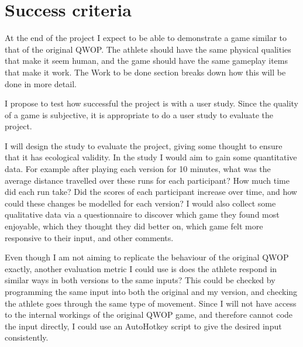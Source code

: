 \documentclass[12pt,a4paper,twoside]{article}
\begin{document}
\section*{Success criteria}


At the end of the project I expect to be able to demonstrate a game similar to that of the original QWOP.
The athlete should have the same physical qualities that make it seem human, and the game should have the same gameplay items that make it work. The Work to be done section breaks down how this will be done in more detail.

I propose to test how successful the project is with a user study. Since the quality of a game is subjective, it is appropriate to do a user study to evaluate the project.

I will design the study to evaluate the project, giving some thought to ensure that it has ecological validity.
In the study I would aim to gain some quantitative data.
For example after playing each version for 10 minutes, what was the average distance travelled over these runs for each participant? How much time did each run take? Did the scores of each participant increase over time, and how could these changes be modelled for each version?
I would also collect some qualitative data via a questionnaire to discover which game they found most enjoyable, which they thought they did better on, which game felt more responsive to their input, and other comments.

Even though I am not aiming to replicate the behaviour of the original QWOP exactly, another evaluation metric I could use is does the athlete respond in similar ways in both versions to the same inputs? This could be checked by programming the same input into both the original and my version, and checking the athlete goes through the same type of movement. 
Since I will not have access to the internal workings of the original QWOP game, and therefore cannot code the input directly, I could use an AutoHotkey script to give the desired input consistently.
\end{document}
